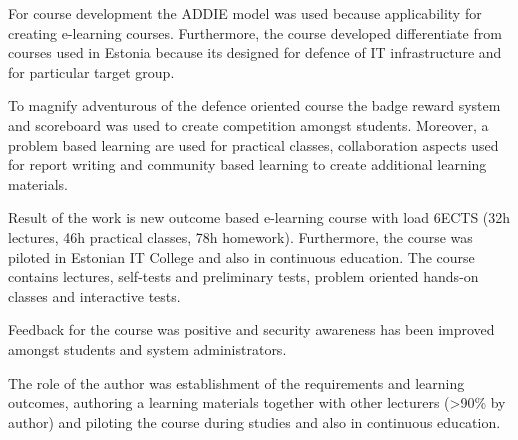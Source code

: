 For course development the \gls{ADDIE} model was used because applicability for creating e-learning courses. Furthermore, the course developed differentiate from courses used in Estonia because its designed for defence of IT infrastructure and for particular target group.

To magnify adventurous of the defence oriented course the badge reward system and scoreboard was used to create competition amongst students. Moreover, a problem based learning are used for practical classes, collaboration aspects used for report writing and community based learning to create additional learning materials.

Result of the work is new outcome based e-learning course with load 6ECTS (32h lectures, 46h practical classes, 78h homework). Furthermore, the course was piloted in Estonian IT College and also in continuous education. The course contains lectures, self-tests and preliminary tests, problem oriented hands-on classes and interactive tests.

Feedback for the course was positive and security awareness has been improved amongst students and system administrators. %

The role of the author was establishment of the requirements and learning outcomes, authoring a learning materials together with other lecturers (>90\% by author) and piloting the course during studies and also in continuous education. 
